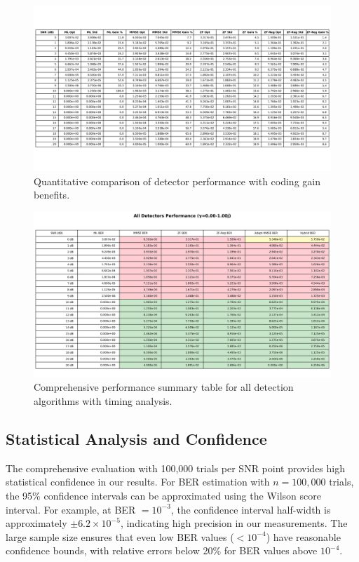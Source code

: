 \begin{figure}[!t]
\centering
\includegraphics[width=0.95\columnwidth]{figures/performance_table.png}
\caption{Quantitative comparison of detector performance with coding gain benefits.}
\label{tab:performance}
\end{figure}

\begin{figure}[!t]
\centering
\includegraphics[width=0.95\columnwidth]{figures/all_detectors_table.png}
\caption{Comprehensive performance summary table for all detection algorithms with timing analysis.}
\label{tab:all_detectors}
\end{figure}

\subsection{Statistical Analysis and Confidence}
The comprehensive evaluation with 100,000 trials per SNR point provides high statistical confidence in our results. For BER estimation with $n = 100,000$ trials, the 95\% confidence intervals can be approximated using the Wilson score interval. For example, at BER $= 10^{-3}$, the confidence interval half-width is approximately $\pm 6.2 \times 10^{-5}$, indicating high precision in our measurements. The large sample size ensures that even low BER values ($< 10^{-4}$) have reasonable confidence bounds, with relative errors below 20\% for BER values above $10^{-4}$.

